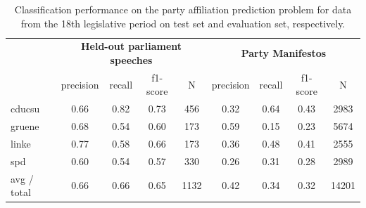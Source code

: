 \documentclass[runningheads,a4paper]{llncs}
\begin{document}
\begin{table}[t]
\begin{center}
\begin{tabular}{lcccccccc}
& \multicolumn{4}{c}{\bf Held-out parliament speeches} & \multicolumn{4}{c}{\bf Party Manifestos}\\
    &         precision    &recall &  f1-score  & N    &         precision    &recall &  f1-score  & N\\
\hline \hline
    cducsu    &   0.66   &   0.82   &   0.73    &   456 & 0.32  &    0.64  &    0.43    &  2983\\
     gruene   &    0.68    &  0.54   &   0.60    &   173   &0.59   &   0.15   &   0.23   &   5674\\
      linke     &  0.77  &    0.58    &  0.66    &   173 & 0.36   &   0.48   &   0.41   &   2555\\
        spd     &  0.60  &    0.54   &   0.57    &   330 & 0.26 &     0.31   &   0.28     & 2989\\
\hline
avg / total    &   0.66  &    0.66  &    0.65   &   1132&  0.42 &     0.34  &    0.32&     14201\\
%
\end{tabular}
\end{center}
\caption{
\label{tab:results_18}
Classification performance on the party affiliation prediction problem for data from the 18th legislative period on test set and evaluation set, respectively. 
}
\end{table}
\end{document}
